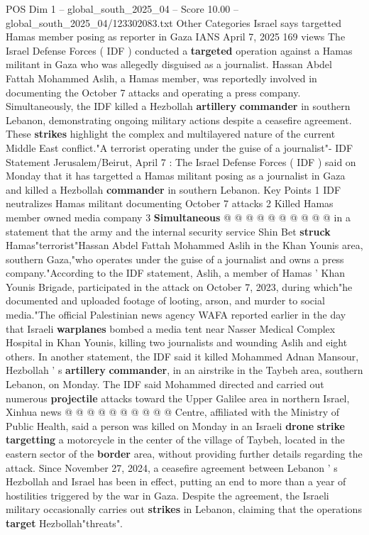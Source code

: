 \begin{textsample}{POS Dim 1 – global\_south\_2025\_04 – Score 10.00 – global\_south\_2025\_04/123302083.txt}  \label{ex:f1_pos_330}
Other Categories Israel says targetted Hamas member posing as reporter in Gaza IANS April 7, 2025 169 views The Israel Defense Forces ( IDF ) conducted a \textbf{targeted} operation against a Hamas militant in Gaza who was allegedly disguised as a journalist.
Hassan Abdel Fattah Mohammed Aslih, a Hamas member, was reportedly involved in documenting the October 7 attacks and operating a press company.
Simultaneously, the IDF killed a Hezbollah \textbf{artillery} \textbf{commander} in southern Lebanon, demonstrating ongoing military actions despite a ceasefire agreement.
These \textbf{strikes} highlight the complex and multilayered nature of the current Middle East conflict."A terrorist operating under the guise of a journalist"- IDF Statement Jerusalem/Beirut, April 7 : The Israel Defense Forces ( IDF ) said on Monday that it has targetted a Hamas militant posing as a journalist in Gaza and killed a Hezbollah \textbf{commander} in southern Lebanon.
Key Points 1 IDF neutralizes Hamas militant documenting October 7 attacks 2 Killed Hamas member owned media company 3 \textbf{Simultaneous} @ @ @ @ @ @ @ @ @ @ in a statement that the army and the internal security service Shin Bet \textbf{struck} Hamas"terrorist"Hassan Abdel Fattah Mohammed Aslih in the Khan Younis area, southern Gaza,"who operates under the guise of a journalist and owns a press company."According to the IDF statement, Aslih, a member of Hamas ' Khan Younis Brigade, participated in the attack on October 7, 2023, during which"he documented and uploaded footage of looting, arson, and murder to social media."The official Palestinian news agency WAFA reported earlier in the day that Israeli \textbf{warplanes} bombed a media tent near Nasser Medical Complex Hospital in Khan Younis, killing two journalists and wounding Aslih and eight others.
In another statement, the IDF said it killed Mohammed Adnan Mansour, Hezbollah ' s \textbf{artillery} \textbf{commander}, in an airstrike in the Taybeh area, southern Lebanon, on Monday.
The IDF said Mohammed directed and carried out numerous \textbf{projectile} attacks toward the Upper Galilee area in northern Israel, Xinhua news @ @ @ @ @ @ @ @ @ @ Centre, affiliated with the Ministry of Public Health, said a person was killed on Monday in an Israeli \textbf{drone} \textbf{strike} \textbf{targetting} a motorcycle in the center of the village of Taybeh, located in the eastern sector of the \textbf{border} area, without providing further details regarding the attack.
Since November 27, 2024, a ceasefire agreement between Lebanon ' s Hezbollah and Israel has been in effect, putting an end to more than a year of hostilities triggered by the war in Gaza.
Despite the agreement, the Israeli military occasionally carries out \textbf{strikes} in Lebanon, claiming that the operations \textbf{target} Hezbollah"threats".

\end{textsample}
